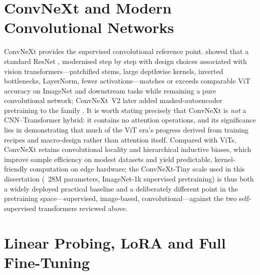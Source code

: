\section{ConvNeXt and Modern Convolutional Networks}
\label{sec:lr-convnext}

ConvNeXt provides the supervised convolutional reference point. \citet{liu2022convnet} showed that a standard ResNet \citep{he2016deep}, modernised step by step with design choices associated with vision transformers---patchified stems, large depthwise kernels, inverted bottlenecks, LayerNorm, fewer activations---matches or exceeds comparable ViT accuracy on ImageNet and downstream tasks while remaining a pure convolutional network; ConvNeXt~V2 later added masked-autoencoder pretraining to the family \citep{woo2023convnextv2}. It is worth stating precisely that ConvNeXt is \emph{not} a CNN--Transformer hybrid: it contains no attention operations, and its significance lies in demonstrating that much of the ViT era's progress derived from training recipes and macro-design rather than attention itself. Compared with ViTs, ConvNeXt retains convolutional locality and hierarchical inductive biases, which improve sample efficiency on modest datasets and yield predictable, kernel-friendly computation on edge hardware; the ConvNeXt-Tiny scale used in this dissertation (~28M parameters, ImageNet-1k supervised pretraining) is thus both a widely deployed practical baseline and a deliberately different point in the pretraining space---supervised, image-based, convolutional---against the two self-supervised transformers reviewed above.

\section{Linear Probing, LoRA and Full Fine-Tuning}
\label{sec:lr-adaptation}

